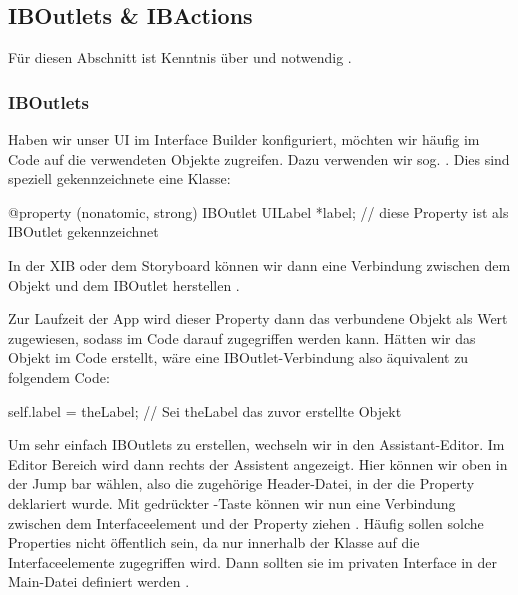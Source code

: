 \documentclass[parskip=half, final]{scrreprt}
\begin{document}
\subsection{IBOutlets \& IBActions}\label{sec:iboutletsibactions}

 Für diesen Abschnitt ist Kenntnis über   und   notwendig .

\subsubsection{IBOutlets}

Haben wir unser UI im Interface Builder konfiguriert, möchten wir häufig im Code auf die verwendeten Objekte zugreifen. Dazu verwenden wir sog. . Dies sind speziell gekennzeichnete  eine Klasse:
\begin{objclst}
@property (nonatomic, strong) IBOutlet UILabel *label; // diese Property ist als IBOutlet gekennzeichnet
\end{objclst}

In der XIB oder dem Storyboard können wir dann eine Verbindung zwischen dem Objekt und dem IBOutlet herstellen .


Zur Laufzeit der App wird dieser Property dann das verbundene Objekt als Wert zugewiesen, sodass im Code darauf zugegriffen werden kann. Hätten wir das Objekt im Code erstellt, wäre eine IBOutlet-Verbindung also äquivalent zu folgendem Code:
\begin{objclst}
self.label = theLabel; // Sei theLabel das zuvor erstellte Objekt
\end{objclst}

Um sehr einfach IBOutlets zu erstellen, wechseln wir in den Assistant-Editor. Im Editor Bereich wird dann rechts der Assistent angezeigt. Hier können wir oben in der Jump bar  wählen, also die zugehörige Header-Datei, in der die Property deklariert wurde. Mit gedrückter \keys{\ctrlkey}-Taste können wir nun eine Verbindung zwischen dem Interfaceelement und der Property ziehen . Häufig sollen solche Properties nicht öffentlich sein, da nur innerhalb der Klasse auf die Interfaceelemente zugegriffen wird. Dann sollten sie im privaten Interface in der Main-Datei definiert werden .
\end{document}
